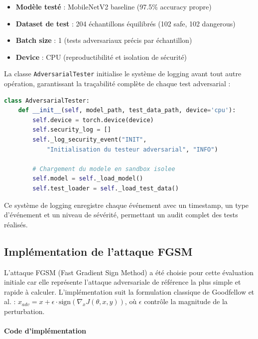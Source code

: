 \begin{itemize}
    \item \textbf{Modèle testé} : MobileNetV2 baseline (97.5\% accuracy propre)
    \item \textbf{Dataset de test} : 204 échantillons équilibrés (102 safe, 102 dangerous)
    \item \textbf{Batch size} : 1 (tests adversariaux précis par échantillon)
    \item \textbf{Device} : CPU (reproductibilité et isolation de sécurité)
\end{itemize}

La classe \texttt{AdversarialTester} initialise le système de logging avant tout autre opération, garantissant la traçabilité complète de chaque test adversarial :

\begin{lstlisting}[language=Python, caption=Initialisation du testeur adversarial]
class AdversarialTester:
    def __init__(self, model_path, test_data_path, device='cpu'):
        self.device = torch.device(device)
        self.security_log = []
        self._log_security_event("INIT",
            "Initialisation du testeur adversarial", "INFO")

        # Chargement du modele en sandbox isolee
        self.model = self._load_model()
        self.test_loader = self._load_test_data()
\end{lstlisting}

Ce système de logging enregistre chaque événement avec un timestamp, un type d'événement et un niveau de sévérité, permettant un audit complet des tests réalisés.


\subsection{Implémentation de l'attaque FGSM}

L'attaque FGSM (Fast Gradient Sign Method) a été choisie pour cette évaluation initiale car elle représente l'attaque adversariale de référence la plus simple et rapide à calculer. L'implémentation suit la formulation classique de Goodfellow et al. : $x_{adv} = x + \epsilon \cdot \text{sign}(\nabla_x J(\theta, x, y))$, où $\epsilon$ contrôle la magnitude de la perturbation.

\paragraph{Code d'implémentation}

